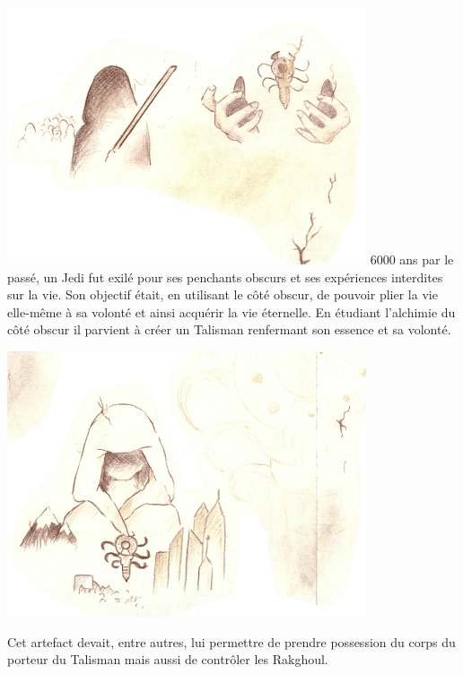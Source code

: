 \begin{quotebox}
\noindent\includegraphics[width=\linewidth]{_img/places/monolithe-001.png}
6000 ans par le passé, un Jedi fut exilé pour ses penchants obscurs et ses expériences interdites sur la vie. Son objectif était, en utilisant le côté obscur, de pouvoir plier la vie elle-même à sa volonté et ainsi acquérir la vie éternelle. En étudiant l’alchimie du côté obscur il parvient à créer un Talisman renfermant son essence et sa volonté. 

\noindent\includegraphics[width=\linewidth]{_img/places/monolithe-002.png}

Cet artefact devait, entre autres, lui permettre de prendre possession du corps du porteur du Talisman mais aussi de contrôler les Rakghoul.


\end{quotebox}
